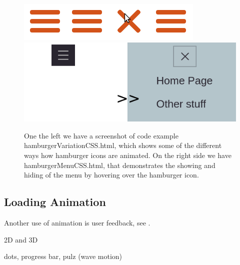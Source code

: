 \begin{figure}[tp]
\centering
\includegraphics[keepaspectratio,scale=0.5]{images/hamburgerVar.png}
\includegraphics[keepaspectratio,scale=0.5]{images/hamburgerMenu.png}

\caption[Hamburger Examples]{
One the left we have a screenshot of code example hamburgerVariationCSS.html, which shows some of the different ways how hamburger icons are animated. On the right side we have hamburgerMenuCSS.html, that demonstrates the showing and hiding of the menu by hovering over the hamburger icon.
}
\label{fig:storyboard}
\end{figure}



\label{subsub:menu}


\subsection{Loading Animation} %
\label{sub:loadingCSS}

Another use of animation is user feedback, see .

\label{subsub:rotation_loader}
2D and 3D

\label{subsub:menu}

dots, progress bar, pulz (wave motion)


